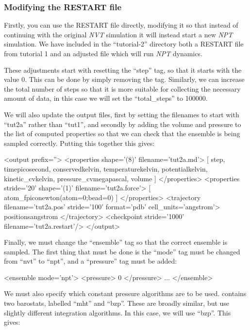 \documentclass[11pt,english,fleqn]{report}
\newenvironment{code}{%
\footnotesize 
\verbatim
}{
\endverbatim
\normalsize
}
\begin{document}
\subsubsection{Modifying the RESTART file}

Firstly, you can use the RESTART file directly, modifying it
so that instead of continuing with the original \emph{NVT} simulation
it will instead start a new \emph{NPT} simulation. We have included
in the {}``tutorial-2'' directory both a RESTART file from
tutorial 1 and an adjusted file which will run \emph{NPT} dynamics.

These adjustments start with resetting the {}``step'' tag, so that
it starts with the value 0. This can be done by simply removing the
tag. Similarly, we can increase the total number of
steps so that it is more suitable for collecting the necessary
amount of data, in this case we will set the 
{}``total\_steps'' to 100000.

We will also update the output files, first by setting the filenames
to start with {}``tut2a'' rather than {}``tut1'', and secondly by adding
the volume and pressure to the list of computed properties so that
we can check that the ensemble is being sampled correctly.
Putting this together this gives:

\begin{code}
<output prefix=''>
   <properties shape='(8)' filename='tut2a.md'>
      [ step, time{picosecond}, conserved{kelvin}, 
        temperature{kelvin}, potential{kelvin}, kinetic_cv{kelvin}, 
        pressure_cv{megapascal}, volume ] 
   </properties>
   <properties stride='20' shape='(1)' filename='tut2a.force'> 
      [ atom_f{piconewton}(atom=0;bead=0) ] 
   </properties>
   <trajectory filename='tut2a.pos' stride='100' format='pdb' cell_units='angstrom'>
      positions{angstrom}
   </trajectory>
   <checkpoint stride='1000' filename='tut2a.restart'/>
</output>
\end{code}

Finally, we must change the {}``ensemble'' tag so that the correct
ensemble is sampled. The first thing that must be done is  
the {}``mode'' tag must be changed from {}``nvt'' to {}``npt'',
and a {}``pressure'' tag must be added:

\begin{code}
<ensemble mode='npt'>
   <pressure> 0 </pressure>
   ...
</ensemble>
\end{code}

We must also specify which constant pressure algorithms are to be used.
\ipi contains two barostats, labelled {}``mht'' and {}``bzp''. These are
broadly similar, but use slightly different integration algorithms.
In this case, we will use {}``bzp''. This gives:
\end{document}
